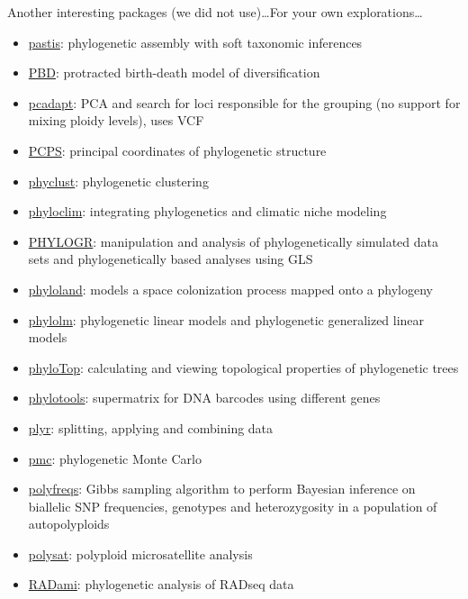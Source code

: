 \documentclass[compress, ucs, xelatex, 11pt, xcolor=svgnames,
  hyperref={
    bookmarks=true,
    unicode=true,
    colorlinks=true,
    pdftitle={Molecular data in R},
    plainpages=false,
    pdfauthor={Vojtech Zeisek},
    pdfsubject={Course about phylogeny and evolution in R},
    pdfcreator={XeLaTeX},
    pdfkeywords={R, evolution, phylogeny, molecular data},
    linkcolor=Tomato,
    anchorcolor=SaddleBrown,
    citecolor=Goldenrod,
    filecolor=DarkMagenta,
    menucolor=Sienna,
    urlcolor=DarkTurquoise,
    pdftex},
  url={hyphens, lowtilde} %
  ]{beamer}
\begin{document}
\begin{frame}[allowframebreaks]{Another interesting packages (we did not use)\ldots}{For your own explorations\ldots}
\begin{itemize}
    \item \href{https://CRAN.R-project.org/package=pastis}{pastis}: phylogenetic assembly with soft taxonomic inferences
    \item \href{https://CRAN.R-project.org/package=PBD}{PBD}: protracted birth-death model of diversification
    \item \href{https://CRAN.R-project.org/package=pcadapt}{pcadapt}: PCA and search for loci responsible for the grouping (no support for mixing ploidy levels), uses VCF
    \item \href{https://CRAN.R-project.org/package=PCPS}{PCPS}: principal coordinates of phylogenetic structure
    \item \href{https://CRAN.R-project.org/package=phyclust}{phyclust}: phylogenetic clustering
    \item \href{https://CRAN.R-project.org/package=phyloclim}{phyloclim}: integrating phylogenetics and climatic niche modeling
    \item \href{https://CRAN.R-project.org/package=PHYLOGR}{PHYLOGR}: manipulation and analysis of phylogenetically simulated data sets and phylogenetically based analyses using GLS
    \item \href{https://CRAN.R-project.org/package=phyloland}{phyloland}: models a space colonization process mapped onto a phylogeny
    \item \href{https://CRAN.R-project.org/package=phylolm}{phylolm}: phylogenetic linear models and phylogenetic generalized linear models
    \item \href{https://CRAN.R-project.org/package=phyloTop}{phyloTop}: calculating and viewing topological properties of phylogenetic trees
    \item \href{https://CRAN.R-project.org/package=phylotools}{phylotools}: supermatrix for DNA barcodes using different genes
    \item \href{https://CRAN.R-project.org/package=plyr}{plyr}: splitting, applying and combining data
    \item \href{https://CRAN.R-project.org/package=pmc}{pmc}: phylogenetic Monte Carlo
    \item \href{https://CRAN.R-project.org/package=polyfreqs}{polyfreqs}: Gibbs sampling algorithm to perform Bayesian inference on biallelic SNP frequencies, genotypes and heterozygosity in a population of autopolyploids
    \item \href{https://CRAN.R-project.org/package=polysat}{polysat}: polyploid microsatellite analysis
    \item \href{https://CRAN.R-project.org/package=RADami}{RADami}: phylogenetic analysis of RADseq data

\end{itemize}
\end{frame}
\end{document}
